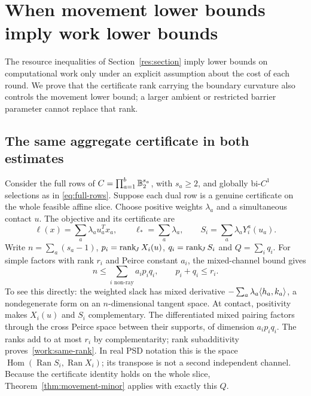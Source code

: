 \section{When movement lower bounds imply work lower bounds}
\label{work:section}

The resource inequalities of Section~\ref{res:section} imply lower bounds
on computational work only under an explicit assumption about the cost of
each round. We prove that the certificate rank carrying the
boundary curvature also controls the movement lower bound; a larger
ambient or restricted barrier parameter cannot replace that rank.

\subsection{The same aggregate certificate in both estimates}
Consider the full rows of $C=\prod_{a=1}^b\mathbb B_2^{s_a}$, with
$s_a\geq2$, and globally bi-$C^1$ selections as in
\eqref{eq:full-rows}. Suppose each dual row is a genuine certificate on
the whole feasible affine slice. Choose positive weights $\lambda_a$ and
a simultaneous contact $u$. The objective and its certificate are
\[
 \ell(x)=\sum_a\lambda_a u_a^Tx_a,\qquad
 \ell_*=\sum_a\lambda_a,\qquad
 S_i=\sum_a\lambda_aY_i^a(u_a).
\]
Write $n=\sum_a(s_a-1)$, $p_i=\operatorname{rank}_{\!J} X_i(u)$,
$q_i=\operatorname{rank}_{\!J} S_i$ and $Q=\sum_iq_i$. For simple factors with rank $r_i$
and Peirce constant $a_i$, the mixed-channel bound gives
\begin{equation}\label{work:same-rank}
 n\leq\sum_{i\text{ non-ray}}a_i p_iq_i,
 \qquad p_i+q_i\leq r_i.
\end{equation}
To see this directly: the weighted slack has mixed derivative
$-\sum_a\lambda_a\langle h_a,k_a\rangle$, a nondegenerate form on an
$n$-dimensional tangent space. At contact, positivity makes $X_i(u)$
and $S_i$ complementary. The differentiated mixed pairing factors through
the cross Peirce space between their supports, of dimension $a_ip_iq_i$.
The ranks add to at most $r_i$ by complementarity; rank subadditivity
proves~\eqref{work:same-rank}. In real PSD notation this is the space
$\operatorname{Hom}(\operatorname{Ran}S_i,\operatorname{Ran}X_i)$;
its transpose is not a second independent channel.
Because the certificate identity holds on the whole slice,
Theorem~\ref{thm:movement-minor} applies with exactly this $Q$.

